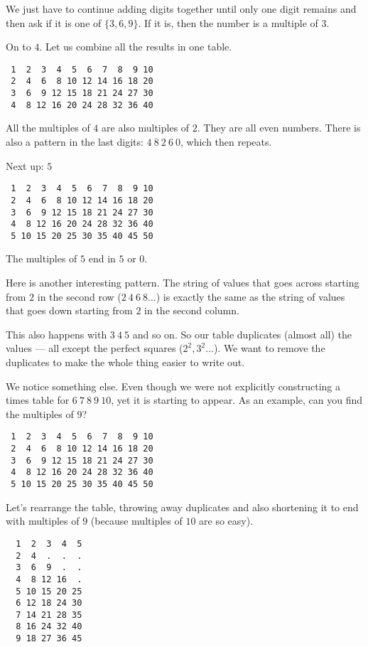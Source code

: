 \documentclass[11pt, oneside]{article}
\begin{document}
We just have to continue adding digits together until only one digit remains and then ask if it is one of $\{3,6,9\}$.  If it is, then the number is a multiple of $3$.

On to $4$.  Let us combine all the results in one table.

\begin{verbatim}
 1  2  3  4  5  6  7  8  9 10
 2  4  6  8 10 12 14 16 18 20
 3  6  9 12 15 18 21 24 27 30
 4  8 12 16 20 24 28 32 36 40
\end{verbatim}

All the multiples of $4$ are also multiples of $2$.  They are all even numbers.  There is also a pattern in the last digits:  $4\  8\  2\  6\  0$, which then repeats.

Next up:  $5$

\begin{verbatim}
 1  2  3  4  5  6  7  8  9 10
 2  4  6  8 10 12 14 16 18 20
 3  6  9 12 15 18 21 24 27 30
 4  8 12 16 20 24 28 32 36 40
 5 10 15 20 25 30 35 40 45 50
\end{verbatim}

The multiples of $5$ end in $5$ or $0$.

Here is another interesting pattern.  The string of values that goes across starting from $2$ in the second row ($2 \ 4 \ 6 \ 8 \dots$) is exactly the same as the string of values that goes down starting from $2$ in the second column.

This also happens with $3\ 4 \ 5$ and so on.  So our table duplicates (almost all) the values --- all except the perfect squares ($2^2, 3^2 \dots$).  We want to remove the duplicates to make the whole thing easier to write out.

We notice something else.  Even though we were not explicitly constructing a times table for $6\ 7 \ 8\ 9\ 10$, yet it is starting to appear.  As an example, can you find the multiples of $9$?

\begin{verbatim}
 1  2  3  4  5  6  7  8  9 10
 2  4  6  8 10 12 14 16 18 20
 3  6  9 12 15 18 21 24 27 30
 4  8 12 16 20 24 28 32 36 40
 5 10 15 20 25 30 35 40 45 50
\end{verbatim}

Let's rearrange the table, throwing away duplicates and also shortening it to end with multiples of $9$ (because multiples of $10$ are so easy).

\begin{verbatim}
  1  2  3  4  5 
  2  4  .  .  .
  3  6  9  .  .
  4  8 12 16  .
  5 10 15 20 25
  6 12 18 24 30
  7 14 21 28 35
  8 16 24 32 40
  9 18 27 36 45
\end{verbatim}
\end{document}
